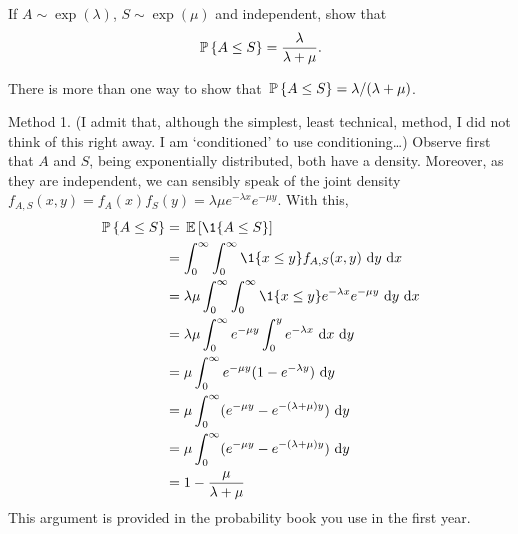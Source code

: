 \begin{question}\label{ex:3}
   If $A\sim \exp(\lambda)$, $S\sim\exp(\mu)$ and independent, show that 
    \begin{equation*}
      \P{A\leq S} = \frac{\lambda}{\lambda+\mu}.
    \end{equation*}


\begin{solution}
There is more than one way to show that $\P{A\leq S} = \lambda/(\lambda+\mu)$.  

Method 1. (I admit that, although the simplest, least technical,
method, I did not think of this right away. I am `conditioned' to use
conditioning\ldots) Observe first that $A$ and $S$, being
exponentially distributed, both have a density. Moreover, as they are
independent, we can sensibly speak of the joint density
$f_{A,S}(x,y) = f_A(x)f_S(y) = \lambda \mu e^{-\lambda x} e^{-\mu
  y}$. With this,
\begin{equation*}
  \begin{split}
    \P{A\leq S} 
&= \E{\1{A\leq S}} \\
&= \int_0^\infty \int_0^\infty \1{x\leq y} f_{A,S}(x,y)\, \d y\,\d x\\
&= \lambda \mu \int_0^\infty \int_0^\infty \1{x\leq y} e^{-\lambda x} e^{-\mu y} \, \d y\,\d x\\
&= \lambda \mu \int_0^\infty e^{-\mu y} \int_0^y e^{-\lambda x}\, \d x \, \d y \\
&= \mu \int_0^\infty e^{-\mu y} (1-e^{-\lambda y})\,\d y\\
&= \mu \int_0^\infty (e^{-\mu y} - e^{-(\lambda +\mu)y} ) \,\d y\\
&= \mu \int_0^\infty (e^{-\mu y} - e^{-(\lambda +\mu)y} ) \,\d y\\
&= 1 - \frac{\mu}{\lambda + \mu} 
  \end{split}
\end{equation*}
This argument is provided in the probability book you use in the first year.


\end{solution}
\end{question}
